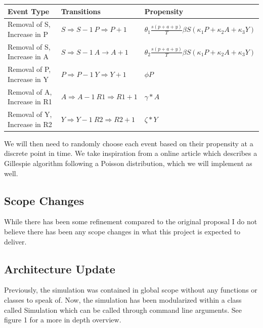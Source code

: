 \documentclass{article}
\begin{document}
\begin{center}
  \begin{tabular}{|l | l | l |}
    \hline
    Event Type                   & Transitions                                    & Propensity                                                                       \\ [0.5ex]
    \hline\hline
    Removal of S, Increase in P  & $S \Rightarrow S - 1 \> P \Rightarrow P + 1$   & $\theta _1 \frac{s(p+a+y)}{T} \beta S (\kappa _1 P + \kappa _2 A + \kappa _3 Y)$ \\
    \hline
    Removal of S, Increase in A  & $S \Rightarrow S - 1 \> A \rightarrow A + 1$   & $ \theta _2 \frac{s(p+a+y)}{T} \beta S (\kappa _1 P + \kappa _2 A+ \kappa _3 Y)$ \\
    \hline

    Removal of P, Increase in Y  & $P \Rightarrow P - 1 \> Y \Rightarrow Y + 1$   & $\phi P$                                                                         \\
    \hline
    Removal of A, Increase in R1 & $A \Rightarrow A - 1 \> R1 \Rightarrow R1 + 1$ & $\gamma * A$                                                                     \\
    \hline
    Removal of Y, Increase in R2 & $Y \Rightarrow Y - 1 \> R2 \Rightarrow R2 + 1$ & $\zeta * Y$                                                                      \\
    \hline
  \end{tabular}
\end{center}

We will then need to randomly choose each event based on their propensity at a discrete point in time. We take inspiration from a online article which describes a Gillespie algorithm following a Poisson distribution, which we will implement as well.
\cite{gillespie}

\subsection{Scope Changes}
While there has been some refinement compared to the original proposal I do not believe there has been any scope changes in what this project is expected to deliver.

\subsection{Architecture Update}
Previously, the simulation was contained in global scope without any functions or classes to speak of. Now, the simulation has been modularized within a class called Simulation which can be called through command line arguments. See figure 1 for a more in depth overview.
\end{document}
